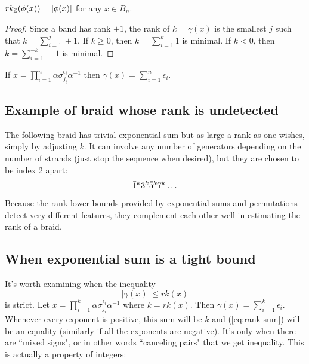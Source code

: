 \documentclass[12pt]{thesis}
\begin{document}
\begin{corollary}
    $rk_{\mathbb{Z}}(\phi(x)) = |\phi(x)|$ for any $x \in B_{n}$.
\end{corollary}

\begin{proof}
    Since a band has rank $\pm 1$, the rank of $k = \gamma(x)$ is 
    the smallest $j$ such that $k = \sum_{i=1}^{j} \pm 1$.
    If $k \geq 0$, then $k = \sum_{i=1}^{k} 1$ is minimal.
    If $k < 0$, then $k = \sum_{i=1}^{-k} -1$ is minimal.
\end{proof}

\begin{corollary}
    If $x = \prod_{i = 1}^{n} \alpha \sigma_{j_{i}}^{\epsilon_{i}}\alpha^{-1}$
    then $\gamma(x) = \sum_{i=1}^{n} \epsilon_{i}$.
\end{corollary}

\subsection{Example of braid whose rank is undetected}

The following braid has trivial exponential sum
but as large a rank as one wishes, simply by adjusting
$k$.
It can involve any number of generators depending
on the number of strands (just stop the sequence when desired),
but they are chosen to be index 2 apart:
\[
    \bar{1}^{k} 3^{k} \bar{5}^{k} 7^{k} \ldots 
\]
Because the rank lower bounds provided by exponential sums and permutations
detect very different features,
they complement each other well in estimating the rank of a braid.

\subsection{When exponential sum is a tight bound}

It's worth examining when the inequality 
\begin{equation}
    \label{eq:rank-sum}
    |\gamma(x)| \leq rk(x)
\end{equation}
is strict.
Let $x = \prod_{i = 1}^{k} \alpha\sigma_{j_{i}}^{\epsilon_{i}}\alpha^{-1}$ 
where $k = rk(x)$.
Then $\gamma(x) = \sum_{i=1}^{k} \epsilon_{i}$.
Whenever every exponent is positive, this sum will be $k$ and (\ref{eq:rank-sum}) will be an equality
(similarly if all the exponents are negative).
It's only when there are ``mixed signs",
or in other words ``canceling pairs" that we get inequality.
This is actually a property of integers:
\end{document}

